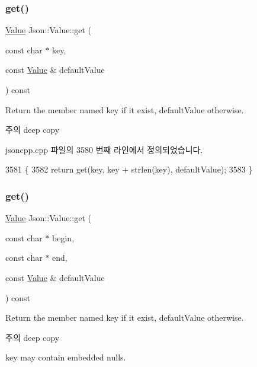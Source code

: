 \subsubsection{\texorpdfstring{get()}{get()}\hspace{0.1cm}{\footnotesize\ttfamily [2/4]}}
{\footnotesize\ttfamily \hyperlink{class_json_1_1_value}{Value} Json\+::\+Value\+::get (\begin{DoxyParamCaption}\item[{const char $\ast$}]{key,  }\item[{const \hyperlink{class_json_1_1_value}{Value} \&}]{default\+Value }\end{DoxyParamCaption}) const}

Return the member named key if it exist, default\+Value otherwise. \begin{DoxyNote}{주의}
deep copy 
\end{DoxyNote}


jsoncpp.\+cpp 파일의 3580 번째 라인에서 정의되었습니다.


\begin{DoxyCode}
3581 \{
3582   \textcolor{keywordflow}{return} \textcolor{keyword}{get}(key, key + strlen(key), defaultValue);
3583 \}
\end{DoxyCode}
\mbox{\label{class_json_1_1_value_aa59ed050e87e1d58d93671a38687f36c}} 
\subsubsection{\texorpdfstring{get()}{get()}\hspace{0.1cm}{\footnotesize\ttfamily [3/4]}}
{\footnotesize\ttfamily \hyperlink{class_json_1_1_value}{Value} Json\+::\+Value\+::get (\begin{DoxyParamCaption}\item[{const char $\ast$}]{begin,  }\item[{const char $\ast$}]{end,  }\item[{const \hyperlink{class_json_1_1_value}{Value} \&}]{default\+Value }\end{DoxyParamCaption}) const}

Return the member named key if it exist, default\+Value otherwise. \begin{DoxyNote}{주의}
deep copy 

key may contain embedded nulls. 
\end{DoxyNote}



